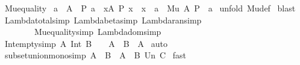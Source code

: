 \begin{isabellebody}
%
\endisadelimproof
\isanewline
{}\isamarkupfalse%
\ Mu{\isacharunderscore}equality{\isacharcolon}\ \isanewline
{\isachardoublequoteopen}{\isacharbrackleft}{\isacharbar}a\ {\isacharcolon}\ A\ {\isacharsemicolon}\ P\ a{\isacharsemicolon}\ {\isacharbang}\ x{\isacharcolon}A{\isachardot}\ P\ x\ {\isacharminus}{\isacharminus}{\isachargreater}\ x\ {\isacharequal}\ a{\isacharbar}{\isacharbrackright}\ {\isacharequal}{\isacharequal}{\isachargreater}\ {\isacharparenleft}Mu\ A\ P{\isacharparenright}\ {\isacharequal}\ a{\isachardoublequoteclose}\isanewline
%
\isadelimproof
%
\endisadelimproof
%
\isatagproof
{}\isamarkupfalse%
\ {\isacharparenleft}unfold\ Mu{\isacharunderscore}def{\isacharparenright}\isanewline
{}\isamarkupfalse%
\ blast\isanewline
{}\isamarkupfalse%
%
\endisatagproof
{\isafoldproof}%
%
\isadelimproof
\isanewline
%
\endisadelimproof
\isanewline
{}\isamarkupfalse%
\ Lambda{\isacharunderscore}total{\isacharbrackleft}simp{\isacharbrackright}\ Lambda{\isacharunderscore}beta{\isacharbrackleft}simp{\isacharbrackright}\ Lambda{\isacharunderscore}ran{\isacharbrackleft}simp{\isacharbrackright}\ \isanewline
\ \ \ \ \ \ \ \ Mu{\isacharunderscore}equality{\isacharbrackleft}simp{\isacharbrackright}\ Lambda{\isacharunderscore}dom{\isacharbrackleft}simp{\isacharbrackright}%
\isamarkuptrue%
\isamarkupfalse%
\ Int{\isacharunderscore}empty{\isacharbrackleft}simp{\isacharbrackright}{\isacharcolon}\ {\isachardoublequoteopen}A\ Int\ B\ {\isacharequal}\ {\isacharbraceleft}{\isacharbraceright}\ {\isacharequal}{\isacharequal}{\isachargreater}\ A\ {\isacharminus}\ B\ {\isacharequal}\ A{\isachardoublequoteclose}\isanewline
%
\isadelimproof
%
\endisadelimproof
%
\isatagproof
{}\isamarkupfalse%
\ auto\isanewline
{}\isamarkupfalse%
%
\endisatagproof
{\isafoldproof}%
%
\isadelimproof
\isanewline
%
\endisadelimproof
\isanewline
{}\isamarkupfalse%
\ subset{\isacharunderscore}union{\isacharunderscore}mono{\isacharbrackleft}simp{\isacharbrackright}{\isacharcolon}\ {\isachardoublequoteopen}A\ {\isacharless}{\isacharequal}\ B\ {\isacharequal}{\isacharequal}{\isachargreater}\ A\ {\isacharless}{\isacharequal}\ B\ Un\ C{\isachardoublequoteclose}\isanewline
%
\isadelimproof
%
\endisadelimproof
%
\isatagproof
{}\isamarkupfalse%
\ fast\isanewline
{}\isamarkupfalse%
%
\endisatagproof
{\isafoldproof}%
%
\isadelimproof
\isanewline
%
\endisadelimproof
\isanewline
{}\isamarkupfalse%

\end{isabellebody}
